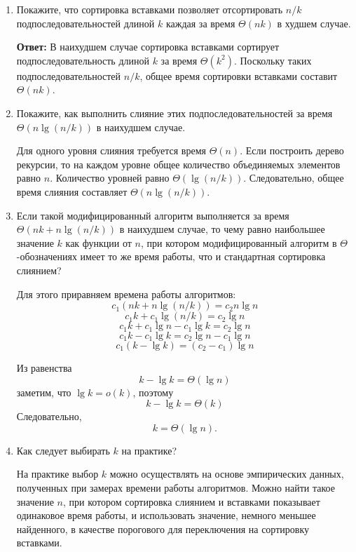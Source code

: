 \begin{enumerate}
    \item[а.] Покажите, что сортировка вставками позволяет отсортировать $n/k$ подпоследовательностей длиной $k$ каждая за время $\Theta(nk)$ в худшем случае.

    \textbf{Ответ:}
    В наихудшем случае сортировка вставками сортирует подпоследовательность длиной $k$ за время $\Theta(k^2)$.
    Поскольку таких подпоследовательностей $n/k$, общее время сортировки вставками составит $\Theta(nk)$.

    \item[б.] Покажите, как выполнить слияние этих подпоследовательностей за время $\Theta(n \lg(n/k))$ в наихудшем случае.

    Для одного уровня слияния требуется время $\Theta(n)$.
    Если построить дерево рекурсии, то на каждом уровне общее количество объединяемых элементов равно $n$.
    Количество уровней равно $\Theta(\lg(n/k))$.
    Следовательно, общее время слияния составляет $\Theta(n \lg(n/k))$.

    \item[в.] Если такой модифицированный алгоритм выполняется за время $\Theta(nk + n \lg(n/k))$ в наихудшем случае,
    то чему равно наибольшее значение $k$ как функции от $n$, при котором модифицированный алгоритм в $\Theta$-обозначениях имеет то же время работы,
    что и стандартная сортировка слиянием?

    Для этого приравняем времена работы алгоритмов:
\[
    c_1(nk + n \lg(n/k)) = c_2 n \lg n
\]
\[
    c_1 k + c_1 \lg(n/k) = c_2 \lg n
\]
\[
    c_1 k + c_1 \lg n - c_1 \lg k = c_2 \lg n
\]
\[
    c_1 k - c_1 \lg k = c_2 \lg n - c_1 \lg n
\]
\[
    c_1 (k - \lg k) = (c_2 - c_1)\lg n
\]

    Из равенства
\[
    k - \lg k = \Theta(\lg n)
\]
заметим, что $\lg k = o(k)$, поэтому
\[
    k - \lg k = \Theta(k)
\]
Следовательно,
\[
    k = \Theta(\lg n).
\]

    \item[г.] Как следует выбирать $k$ на практике?

    На практике выбор $k$ можно осуществлять на основе эмпирических данных, полученных при замерах времени работы алгоритмов.
    Можно найти такое значение $n$, при котором сортировка слиянием и вставками показывает одинаковое время работы,
    и использовать значение, немного меньшее найденного, в качестве порогового для переключения на сортировку вставками.
\end{enumerate}

